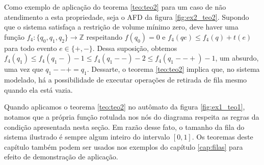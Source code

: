 Como exemplo de aplicação do teorema \ref{teo:teo2} para um caso de não atendimento a esta propriedade, seja o AFD da figura \ref{fig:ex2_teo2}. Supondo que o sistema satisfaça a restrição de volume mínimo zero, deve haver uma função $f_4 : \{ q_0, q_1, q_2 \} \to \mathbb{Z}$ respeitando $f(q_0) = 0$ e $f_4(qe) \leq f_4(q) + t(e)$ para todo evento $e \in \{+, -\}$. Dessa suposição, obtemos $f_4(q_1) \leq f_4(q_1-) - 1 \leq f_4(q_1--) - 2 \leq f_4(q_1--+) - 1$, um absurdo, uma vez que $q_1--+ = q_1$. Dessarte, o teorema \ref{teo:teo2} implica que, no sistema modelado, há a possibilidade de executar operações de retirada de fila mesmo quando ela está vazia.


Quando aplicamos o teorema \ref{teo:teo2} no autômato da figura \ref{fig:ex1_teo1}, notamos que a própria função rotulada nos nós do diagrama respeita as regras da condição apresentada nesta seção. Em razão desse fato, o tamanho da fila do sistema ilustrado é sempre algum inteiro do intervalo $[0,1]$. Os teoremas deste capítulo também podem ser usados nos exemplos do capítulo \ref{cap:filas} para efeito de demonstração de aplicação.

